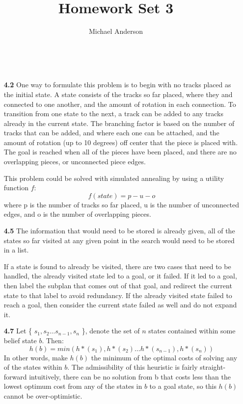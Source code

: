 \documentclass{article}
\author{Michael Anderson}
\title{Homework Set 3}
\begin{document}
\maketitle
{}
\\
\flushleft
\begin{enumerate}
\item[\textbf{4.2}] 
One way to formulate this problem is to begin with no tracks placed as the
initial state. A state consists of the tracks so far placed, where they
and connected to one another, and the amount of rotation in each connection.
To transition from one state to the next, a track can be added
to any tracks already in the current state. The branching factor is based on
the number of tracks that can be added, and where each one can be attached,
and the amount of rotation (up to 10 degrees) off center that the piece is
placed with. The goal is reached when all of the pieces have been placed,
and there are no overlapping pieces, or unconnected piece edges. 

This problem could be solved with simulated annealing by using a utility
function $f$:
\[
    f(state) = p - u - o
\]
where p is the number of tracks so far placed, u is the number of unconnected
edges, and o is the number of overlapping pieces.

\item[\textbf{4.5}] 
The information that would need to be stored is already given, all of the
states so far visited at any given point in the search would need to be stored
in a list.

If a state is found to already be visited, there are two cases that need to be
handled, the already visited state led to a goal, or it failed. If it led to a
goal, then label the subplan that comes out of that goal, and redirect the
current state to that label to avoid redundancy. If the already visited state
failed to reach a goal, then consider the current state failed as well and do
not expand it.

\item[\textbf{4.7}]
Let \{ $s_1,s_2 \ldots s_{n-1}, s_n$ \}, denote the set of $n$ states contained
within some belief state $b$. Then:
\[
   h(b) = min(h*(s_1), h*(s_2) \ldots h*(s_{n-1}),h*(s_n))
\]
In other words, make $h(b)$ the minimum of the optimal costs of solving any of
the states within $b$. The admissibility of this heuristic is fairly straight-
forward intuitively, there can be no solution from b that costs less than the
lowest optimum cost from any of the states in $b$ to a goal state, so this
$h(b)$ cannot be over-optimistic.\\


\end{enumerate}
\end{document}
